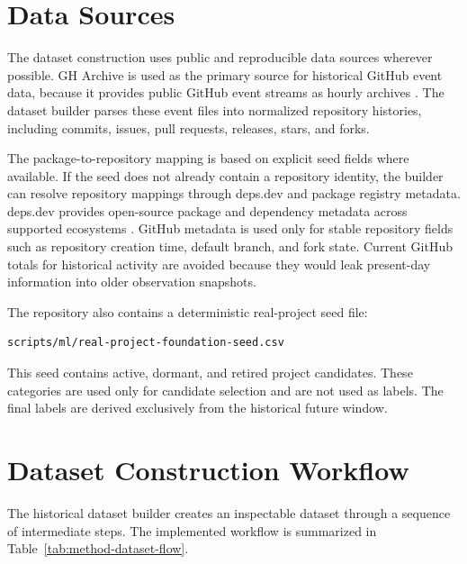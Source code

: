 \section{Data Sources}
\label{sec:method-data-sources}

The dataset construction uses public and reproducible data sources wherever possible. GH Archive is used as the primary source for historical GitHub event data, because it provides public GitHub event streams as hourly archives \cite{gharchive}. The dataset builder parses these event files into normalized repository histories, including commits, issues, pull requests, releases, stars, and forks.

The package-to-repository mapping is based on explicit seed fields where available. If the seed does not already contain a repository identity, the builder can resolve repository mappings through deps.dev and package registry metadata. deps.dev provides open-source package and dependency metadata across supported ecosystems \cite{depsdevApi}. GitHub metadata is used only for stable repository fields such as repository creation time, default branch, and fork state. Current GitHub totals for historical activity are avoided because they would leak present-day information into older observation snapshots.

The repository also contains a deterministic real-project seed file:

\begin{verbatim}
scripts/ml/real-project-foundation-seed.csv
\end{verbatim}

This seed contains active, dormant, and retired project candidates. These categories are used only for candidate selection and are not used as labels. The final labels are derived exclusively from the historical future window.

\section{Dataset Construction Workflow}
\label{sec:method-dataset-construction}

The historical dataset builder creates an inspectable dataset through a sequence of intermediate steps. The implemented workflow is summarized in Table~\ref{tab:method-dataset-flow}.

